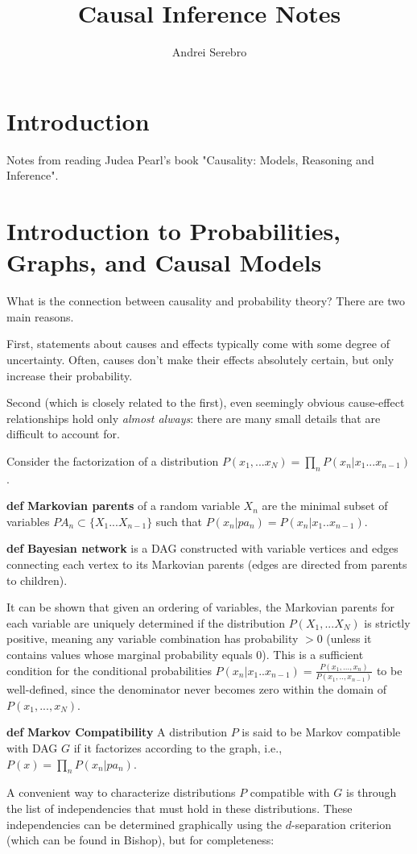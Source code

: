 \documentclass[fleqn]{article}
\title{Causal Inference Notes}
\author{Andrei Serebro}
\def\define#1{\textbf{def} \textbf{#1}}
\numberwithin{equation}{section}
\numberwithin{theorem}{section}
\numberwithin{figure}{section}
\numberwithin{lemma}{section}
\numberwithin{corollary}{section}
\begin{document}
	
	
	\section{Introduction}
	Notes from reading Judea Pearl's book "Causality: Models, Reasoning and Inference".
	
	\section*{Introduction to Probabilities, Graphs, and Causal Models}
	
	What is the connection between causality and probability theory? There are two main reasons.
	
	First, statements about causes and effects typically come with some degree of uncertainty. Often, causes don't make their effects absolutely certain, but only increase their probability.
	
	Second (which is closely related to the first), even seemingly obvious cause-effect relationships hold only \textit{almost always}: there are many small details that are difficult to account for.
	
	Consider the factorization of a distribution $P(x_1,...x_N) = \prod\limits_{n}P(x_n|x_1...x_{n-1})$.
	
	\define{Markovian parents} of a random variable $X_n$ are the minimal subset of variables $PA_n \subset \{X_1...X_{n-1}\}$ such that $P(x_n|pa_n) = P(x_n|x_1..x_{n-1})$.
	
	\define{Bayesian network} is a DAG constructed with variable vertices and edges connecting each vertex to its Markovian parents (edges are directed from parents to children).
	
	It can be shown that given an ordering of variables, the Markovian parents for each variable are uniquely determined if the distribution $P(X_1,...X_N)$ is strictly positive, meaning any variable combination has probability $>0$ (unless it contains values whose marginal probability equals 0). This is a sufficient condition for the conditional probabilities $P(x_n|x_1..x_{n-1}) = \frac{P(x_1, ..., x_n)}{P(x_1,..,x_{n-1})}$ to be well-defined, since the denominator never becomes zero within the domain of $P(x_1,...,x_N)$.
	
	\define{Markov Compatibility} A distribution $P$ is said to be Markov compatible with DAG $G$ if it factorizes according to the graph, i.e., $P(x) = \prod\limits_n P(x_n|pa_n)$.
	
	A convenient way to characterize distributions $P$ compatible with $G$ is through the list of independencies that must hold in these distributions. These independencies can be determined graphically using the $d$-separation criterion (which can be found in Bishop), but for completeness:
	
\end{document}
